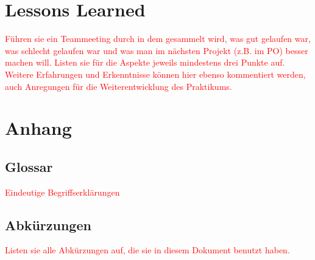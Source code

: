 \documentclass[a4paper, 11pt]{article}
\begin{document}
\section{Lessons Learned}
\textcolor{red}{Führen sie ein Teammeeting durch in dem gesammelt wird, was gut gelaufen war, was schlecht gelaufen war und was man im nächsten Projekt (z.B. im PO) besser machen will. Listen sie für die Aspekte jeweils mindestens drei Punkte auf. Weitere Erfahrungen und Erkenntnisse können hier ebenso kommentiert werden, auch Anregungen für die Weiterentwicklung des Praktikums.}

\section{Anhang}

\subsection{Glossar}
\textcolor{red}{Eindeutige Begriffserklärungen}

\subsection{Abkürzungen}
\textcolor{red}{Listen sie alle Abkürzungen auf, die sie in diesem Dokument benutzt haben.}
\end{document}
